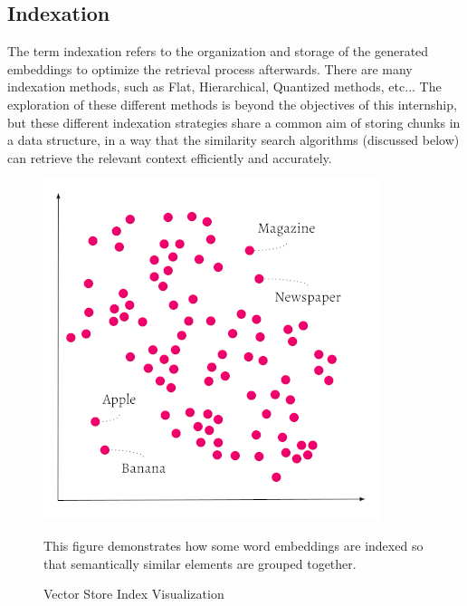 \subsection{Indexation}
The term indexation refers to the organization and storage of the generated embeddings to optimize the retrieval process afterwards. There are many indexation methods, such as Flat, Hierarchical, Quantized methods, etc... The exploration of these different methods is beyond the objectives of this internship, but these different indexation strategies share a common aim of storing chunks in a data structure, in a way that the similarity search algorithms (discussed below) can retrieve the relevant context efficiently and accurately.
\begin{figure}[H]
    \centering
    \includegraphics[width=.5\linewidth]{./figures/vs-indexation.png}
    \caption{Vector Store Index Visualization \cite{weaviateindexing}}
    \begin{flushleft}
        \small This figure demonstrates how some word embeddings are indexed so that semantically similar elements are grouped together.
    \end{flushleft}
\end{figure}
